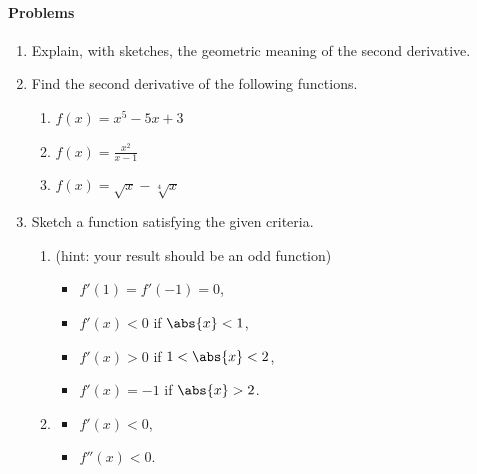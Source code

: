 \paragraph{Problems}
\begin{enumerate}
  \item Explain, with sketches, the geometric meaning of the second derivative.
  \item Find the second derivative of the following functions.
    \begin{enumerate}
      \item $ f(x) = x^5 - 5x + 3 $
      \item $ f(x) = \frac{x^2}{x - 1} $
      \item $ f(x) = \sqrt{x} - \sqrt[4]{x} $
    \end{enumerate}
  \item Sketch a function satisfying the given criteria.
    \begin{enumerate}
      \item (hint: your result should be an odd function)
        \begin{itemize}
           \item $ f'(1) = f'(-1) = 0 $,
           \item $ f'(x) < 0 $ if $ \abs{x} < 1 $,
           \item $ f'(x) > 0 $ if $ 1 < \abs{x} < 2 $,
           \item $ f'(x) = -1 $ if $ \abs{x} > 2 $.
        \end{itemize}
      \item
        \begin{itemize}
          \item $ f'(x) < 0 $,
          \item $ f''(x) < 0 $.
        \end{itemize}
    \end{enumerate}
\end{enumerate}
